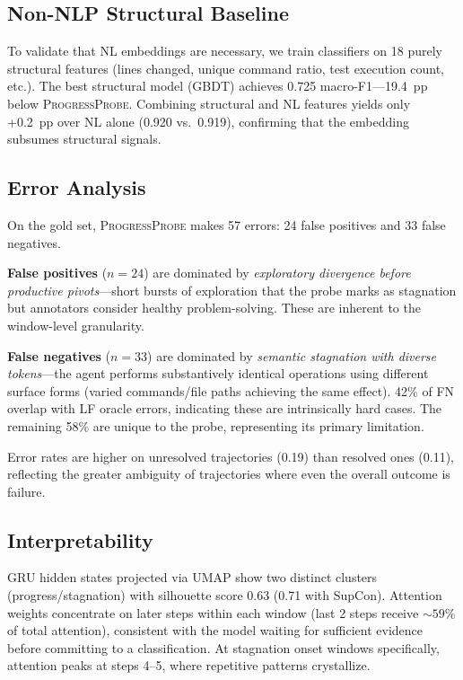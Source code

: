 \documentclass[11pt,a4paper]{article}
\newcommand{\ours}{\textsc{ProgressProbe}}
\begin{document}
\subsection{Non-NLP Structural Baseline}
\label{sec:structural}

To validate that NL embeddings are necessary, we train classifiers on 18 purely structural features (lines changed, unique command ratio, test execution count, etc.). The best structural model (GBDT) achieves 0.725 macro-F1---19.4~pp below \ours{}. Combining structural and NL features yields only +0.2~pp over NL alone (0.920 vs.\ 0.919), confirming that the embedding subsumes structural signals.

\subsection{Error Analysis}
\label{sec:error-analysis}

On the gold set, \ours{} makes 57 errors: 24 false positives and 33 false negatives.

\textbf{False positives} ($n{=}24$) are dominated by \emph{exploratory divergence before productive pivots}---short bursts of exploration that the probe marks as stagnation but annotators consider healthy problem-solving. These are inherent to the window-level granularity.

\textbf{False negatives} ($n{=}33$) are dominated by \emph{semantic stagnation with diverse tokens}---the agent performs substantively identical operations using different surface forms (varied commands/file paths achieving the same effect). 42\% of FN overlap with LF oracle errors, indicating these are intrinsically hard cases. The remaining 58\% are unique to the probe, representing its primary limitation.

Error rates are higher on unresolved trajectories (0.19) than resolved ones (0.11), reflecting the greater ambiguity of trajectories where even the overall outcome is failure.

\subsection{Interpretability}
\label{sec:interpretability}

GRU hidden states projected via UMAP show two distinct clusters (progress/stagnation) with silhouette score 0.63 (0.71 with SupCon). Attention weights concentrate on later steps within each window (last 2 steps receive ${\sim}59$\% of total attention), consistent with the model waiting for sufficient evidence before committing to a classification. At stagnation onset windows specifically, attention peaks at steps 4--5, where repetitive patterns crystallize.
\end{document}

